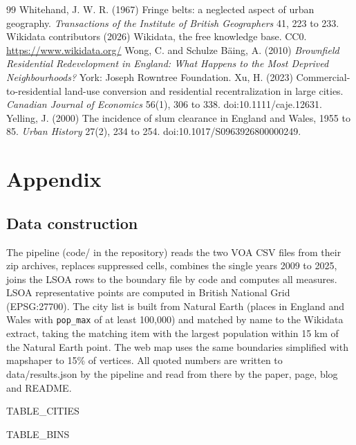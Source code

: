 \begin{thebibliography}{99}
 Whitehand, J. W. R. (1967) Fringe belts: a neglected aspect of urban geography. \textit{Transactions of the Institute of British Geographers} 41, 223 to 233.
 Wikidata contributors (2026) Wikidata, the free knowledge base. CC0. \url{https://www.wikidata.org/}
 Wong, C. and Schulze B\"aing, A. (2010) \textit{Brownfield Residential Redevelopment in England: What Happens to the Most Deprived Neighbourhoods?} York: Joseph Rowntree Foundation.
 Xu, H. (2023) Commercial-to-residential land-use conversion and residential recentralization in large cities. \textit{Canadian Journal of Economics} 56(1), 306 to 338. doi:10.1111/caje.12631.
 Yelling, J. (2000) The incidence of slum clearance in England and Wales, 1955 to 85. \textit{Urban History} 27(2), 234 to 254. doi:10.1017/S0963926800000249.
\end{thebibliography}

\clearpage
\appendix
\section{Appendix}
\subsection{Data construction}
The pipeline (code/ in the repository) reads the two VOA CSV files from their zip archives, replaces suppressed cells, combines the single years 2009 to 2025, joins the LSOA rows to the boundary file by code and computes all measures. LSOA representative points are computed in British National Grid (EPSG:27700). The city list is built from Natural Earth (places in England and Wales with \texttt{pop\_max} of at least 100,000) and matched by name to the Wikidata extract, taking the matching item with the largest population within 15 km of the Natural Earth point. The web map uses the same boundaries simplified with mapshaper to 15\% of vertices. All quoted numbers are written to data/results.json by the pipeline and read from there by the paper, page, blog and README.

{{TABLE_CITIES}}

{{TABLE_BINS}}
